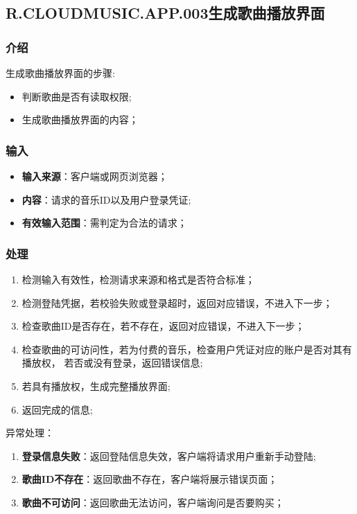 \subsection{R.CLOUDMUSIC.APP.003生成歌曲播放界面}
\subsubsection{介绍}
生成歌曲播放界面的步骤:
	\begin{itemize}
		\item 判断歌曲是否有读取权限;
		\item 生成歌曲播放界面的内容；
	\end{itemize}
\subsubsection{输入}
	\begin{itemize}
		\item \textbf{输入来源}：客户端或网页浏览器；
		\item \textbf{内容}：请求的音乐ID以及用户登录凭证;
		\item \textbf{有效输入范围}：需判定为合法的请求；
	\end{itemize}
\subsubsection{处理}
	\begin{enumerate}
		\item 检测输入有效性，检测请求来源和格式是否符合标准；
		\item 检测登陆凭据，若校验失败或登录超时，返回对应错误，不进入下一步；
		\item 检查歌曲ID是否存在，若不存在，返回对应错误，不进入下一步；
		\item 检查歌曲的可访问性，若为付费的音乐，检查用户凭证对应的账户是否对其有播放权，
			若否或没有登录，返回错误信息;
		\item 若具有播放权，生成完整播放界面;
		\item 返回完成的信息;
	\end{enumerate}
	\noindent 异常处理：
	\begin{enumerate}
		\item \textbf{登录信息失败}：返回登陆信息失效，客户端将请求用户重新手动登陆;
		\item \textbf{歌曲ID不存在}：返回歌曲不存在，客户端将展示错误页面；
		\item \textbf{歌曲不可访问}：返回歌曲无法访问，客户端询问是否要购买；
	\end{enumerate}
